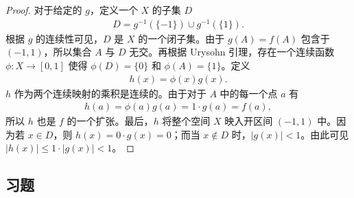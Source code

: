 \begin{proof}
对于给定的 $g$，定义一个 $X$ 的子集 $D$
\begin{align*}
D=g^{-1}(\{-1\})\cup g^{-1}(\{1\}).
\end{align*}
根据 $g$ 的连续性可见，$D$ 是 $X$ 的一个闭子集。由于 $g(A)=f(A)$ 包含于 $(-1,1)$，所以集合 $A$ 与 $D$ 无交。再根据 Urysohn 引理，存在一个连续函数 $\phi\colon X\to[0,1]$ 使得 $\phi(D)=\{0\}$ 和 $\phi(A)=\{1\}$。定义
\begin{align*}
h(x)=\phi(x)g(x).
\end{align*}
$h$ 作为两个连续映射的乘积是连续的。由于对于 $A$ 中的每一个点 $a$ 有
\begin{align*}
h(a)=\phi(a)g(a)=1\cdot g(a)=f(a),
\end{align*}
所以 $h$ 也是 $f$ 的一个扩张。最后，$h$ 将整个空间 $X$ 映入开区间 $(-1,1)$ 中。因为若 $x\in D$，则 $h(x)=0\cdot g(x)=0$；而当 $x\notin D$ 时，$|g(x)|<1$。由此可见 $|h(x)|\leqslant 1\cdot|g(x)|<1$。
\end{proof}

\subsection*{习题}

